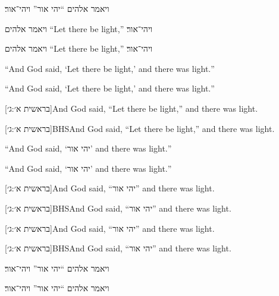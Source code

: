 \documentclass[12pt]{article}
\begin{document}
ויאמר אלהים \enquote{יהי אור} ויהי־אור׃



ויאמר אלהים \foreignquote{english}{Let there be light,} ויהי־אור׃

ויאמר אלהים \hyphenquote{english}{Let there be light,} ויהי־אור׃



\foreignquote{english}{And God said, \enquote{Let there be light,} and there
was light.}

\hyphenquote{english}{And God said, \enquote{Let there be light,} and there
was light.}

[בראשית א׳:ג׳]{And God said, \enquote{Let there be
light,} and there was light.}

[בראשית א׳:ג׳]{BHS}{And God said, \enquote{Let there
be light,} and there was light.}

\foreignquote{english}{And God said, \foreignquote{hebrew}{יהי אור} and there
was light.}

\hyphenquote{english}{And God said, \foreignquote{hebrew}{יהי אור} and there
was light.}

[בראשית א׳:ג׳]{And God said, \foreignquote{hebrew}{יהי
אור} and there was light.}

[בראשית א׳:ג׳]{BHS}{And God said,
\foreignquote{hebrew}{יהי אור} and there was light.}

[בראשית א׳:ג׳]{And God said,
\foreignquote{hebrew}{יהי אור} and there was light.}

[בראשית א׳:ג׳]{BHS}{And God said,
\foreignquote{hebrew}{יהי אור} and there was light.}

\begin{displayquote}
  ויאמר אלהים \enquote{יהי אור} ויהי־אור׃
\end{displayquote}

\begin{displayquote}[בראשית א׳:ג׳]
  ויאמר אלהים \enquote{יהי אור} ויהי־אור׃
\end{displayquote}
\end{document}
